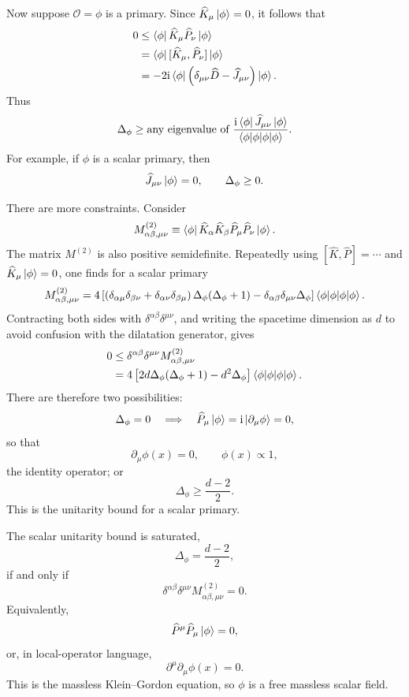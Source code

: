 Now suppose \(\mathcal O=\phi\) is a primary.  Since
\(\widehat K_\mu\ket{\phi}=0\), it follows that
\[
\begin{aligned}
  0
  &\le
  \bra{\phi}\widehat K_\mu\widehat P_\nu\ket{\phi}  \\
  &=
  \bra{\phi}[\widehat K_\mu,\widehat P_\nu]\ket{\phi}  \\
  &=
  -2\mathrm{i}
  \bra{\phi}
  \left(\delta_{\mu\nu}\widehat D-\widehat J_{\mu\nu}\right)
  \ket{\phi}.
\end{aligned}
\]
Thus
\[
  \Delta_\phi
  \ge
  \text{any eigenvalue of }
  \frac{\mathrm{i}\bra{\phi}\widehat J_{\mu\nu}\ket{\phi}}
       {\braket{\phi|\phi}}.
\]
For example, if \(\phi\) is a scalar primary, then
\[
  \widehat J_{\mu\nu}\ket{\phi}=0,
  \qquad
  \Delta_\phi\ge 0.
\]

There are more constraints.  Consider
\[
  M^{(2)}_{\alpha\beta,\mu\nu}
  \equiv
  \bra{\phi}
  \widehat K_\alpha\widehat K_\beta
  \widehat P_\mu\widehat P_\nu
  \ket{\phi}.
\]
The matrix \(M^{(2)}\) is also positive semidefinite.  Repeatedly using
\([\widehat K,\widehat P]=\cdots\) and
\(\widehat K_\mu\ket{\phi}=0\), one finds for a scalar primary
\[
  M^{(2)}_{\alpha\beta,\mu\nu}
  =
  4\left[
    \left(
      \delta_{\alpha\mu}\delta_{\beta\nu}
      +
      \delta_{\alpha\nu}\delta_{\beta\mu}
    \right)\Delta_\phi(\Delta_\phi+1)
    -
    \delta_{\alpha\beta}\delta_{\mu\nu}\Delta_\phi
  \right]\braket{\phi|\phi}.
\]
Contracting both sides with
\(\delta^{\alpha\beta}\delta^{\mu\nu}\), and writing the spacetime
dimension as \(d\) to avoid confusion with the dilatation generator, gives
\[
\begin{aligned}
  0
  &\le
  \delta^{\alpha\beta}\delta^{\mu\nu}
  M^{(2)}_{\alpha\beta,\mu\nu}  \\
  &=
  4\left[2d\Delta_\phi(\Delta_\phi+1)-d^2\Delta_\phi\right]
  \braket{\phi|\phi}.
\end{aligned}
\]
There are therefore two possibilities:
\[
  \Delta_\phi=0
  \quad\Longrightarrow\quad
  \widehat P_\mu\ket{\phi}
  =
  \mathrm{i}\ket{\partial_\mu\phi}=0,
\]
so that
\[
  \partial_\mu\phi(x)=0,
  \qquad
  \phi(x)\propto 1,
\]
the identity operator; or
\[
  \Delta_\phi\ge\frac{d-2}{2}.
\]
This is the unitarity bound for a scalar primary.

The scalar unitarity bound is saturated,
\[
  \Delta_\phi=\frac{d-2}{2},
\]
if and only if
\[
  \delta^{\alpha\beta}\delta^{\mu\nu}
  M^{(2)}_{\alpha\beta,\mu\nu}=0.
\]
Equivalently,
\[
  \widehat P^\mu\widehat P_\mu\ket{\phi}=0,
\]
or, in local-operator language,
\[
  \partial^\mu\partial_\mu\phi(x)=0.
\]
This is the massless Klein--Gordon equation, so \(\phi\) is a free
massless scalar field.

